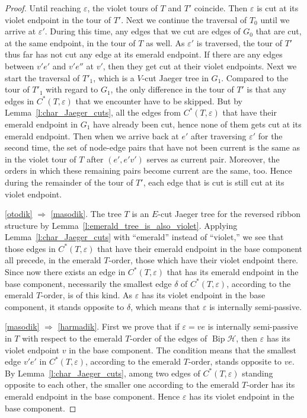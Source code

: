 \documentclass[ALCO,ThmDefs,Unicode,epreuves]{cedram}
\newcommand{\HH}{\mathcal H}
\DeclareMathOperator{\Bip}{Bip}
\begin{document}
\begin{proof}
Until reaching $\varepsilon$, the violet tours of $T$ and $T'$ coincide. Then $\varepsilon$ is cut at its violet endpoint in the tour of $T'$. Next we continue the traversal of $T_0$ until we arrive at $\varepsilon'$. During this time, any edges that we cut are edges of $G_0$ that are cut, at the same endpoint, in the tour of $T$ as well. As $\varepsilon'$ is traversed, the tour of $T'$ thus far has not cut any edge at its emerald endpoint. If there are any edges between $v'e'$ and $v'e''$ at $v'$, then they get cut at their violet endpoints. Next we start the traversal of $T'_1$, which is a $V$-cut Jaeger tree in $G_1$. Compared to the tour of $T'_1$ with regard to $G_1$, the only difference in the tour of $T'$ is that any edges in $C^*(T,\varepsilon)$ that we encounter have to be skipped. But by Lemma~\ref{l:char_Jaeger_cuts}, all the edges from $C^*(T,\varepsilon)$ that have their emerald endpoint in $G_1$ have already been cut, hence none of them gets cut at its emerald endpoint. Then when we arrive back at $e'$ after traversing $\varepsilon'$ for the second time, the set of node-edge pairs that have not been current is the same as in the violet tour of $T$ after $(e',e'v')$ serves as current pair. Moreover, the orders in which these remaining pairs become current are the same, too. Hence during the remainder of the tour of $T'$, each edge that is cut is still cut at its violet endpoint.


\ref{otodik} $\Rightarrow$ \ref{masodik}. The tree $T$ is an $E$-cut Jaeger tree for the reversed ribbon structure by Lemma~\ref{l:emerald_tree_is_also_violet}. Applying Lemma~\ref{l:char_Jaeger_cuts} with ``emerald'' instead of ``violet,'' we see that those edges in $C^*(T,\varepsilon)$ that have their emerald endpoint in the base component all precede, in the emerald $T$-order, those which have their violet endpoint there. Since now there exists an edge in $C^*(T,\varepsilon)$ that has its emerald endpoint in the base component, necessarily the smallest edge $\delta$ of $C^*(T,\varepsilon)$, according to the emerald $T$-order, is of this kind. As $\varepsilon$ has its violet endpoint in the base component, it stands opposite to $\delta$, which means that $\varepsilon$ is internally semi-passive.


\ref{masodik} $\Rightarrow$ \ref{harmadik}. First we prove that if $\varepsilon=ve$ is internally semi-passive in $T$ with respect to the emerald $T$-order of the edges of $\Bip \HH$, then $\varepsilon$ has its violet endpoint $v$ in the base component. The condition means that the smallest edge $v'e'$ in $C^*(T,\varepsilon)$, according to the emerald $T$-order, stands opposite to $ve$. By Lemma~\ref{l:char_Jaeger_cuts}, among two edges of $C^*(T,\varepsilon)$ standing opposite to each other, the smaller one according to the emerald $T$-order has its emerald endpoint in the base component. Hence $\varepsilon$ has its violet endpoint in the base component.


\end{proof}
\end{document}
